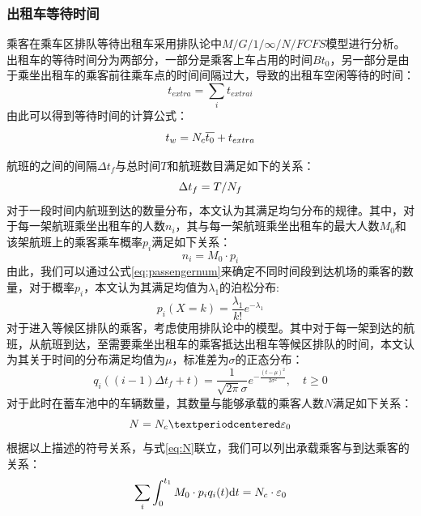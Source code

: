 \documentclass{cumcm}
\begin{document}
\subsubsection{出租车等待时间}
乘客在乘车区排队等待出租车采用排队论中$M/G/1/\infty/N/FCFS$模型进行分析。出租车的等待时间分为两部分，一部分是乘客上车占用的时间$Bt_0$，另一部分是由于乘坐出租车的乘客前往乘车点的时间间隔过大，导致的出租车空闲等待的时间：
\begin{equation}
	t_{extra}=\sum_it_{extrai}
	\label{eq:textrafunc}
\end{equation}
由此可以得到等待时间\waittime 的计算公式：
\begin{equation}
	\mbox{$t_w$}=\mbox{$N_c$}\overline{t_0}+t_{extra}
	\label{eq:tfunc}
\end{equation}
\par
航班的之间的间隔$\Delta t_f$与总时间$T$和航班数目\flightnum 满足如下的关系：
\begin{equation}
	\Delta t_f=T/\mbox{$N_f$}
	\label{eq:deltatf}
\end{equation}
对于一段时间内航班到达的数量分布，本文认为其满足均匀分布的规律。其中，对于每一架航班乘坐出租车的人数$n_i$，其与每一架航班乘坐出租车的最大人数$M_0$和该架航班上的乘客乘车概率$p_i$满足如下关系：
\begin{equation}
	n_i=M_0·p_i
	\label{eq:passengernum}
\end{equation}
由此，我们可以通过公式\ref{eq:passengernum}来确定不同时间段到达机场的乘客的数量，对于概率$p_i$，本文认为其满足均值为$\lambda_1$的泊松分布:
\begin{equation}
	p_i(X=k)=\frac{\lambda_1}{k!}e^{-\lambda_1}
	\label{eq:pi}
\end{equation}
对于进入等候区排队的乘客，考虑使用排队论中的模型。其中对于每一架到达的航班，从航班到达，至需要乘坐出租车的乘客抵达出租车等候区排队的时间，本文认为其关于时间的分布满足均值为$\mu$，标准差为$\sigma$的正态分布：
\begin{equation}
	q_i((i-1)\Delta t_f+t)=\frac{1}{\sqrt{2\pi}\sigma}e^{-\frac{(t-\mu)^2}{2\sigma^2}},\quad t\ge0
	\label{eq:qi}
\end{equation}
对于此时在蓄车池中的车辆数量，其数量\taxinum 与能够承载的乘客人数$N$满足如下关系：
\begin{equation}
	N=\mbox{\taxinum}·\varepsilon_0
	\label{eq:N}
\end{equation}
根据以上描述的符号关系，与式\ref{eq:N}联立，我们可以列出承载乘客与到达乘客的关系：
\begin{equation}
	\sum_i\int_0^{t_1}M_0\cdot p_iq_i(t)\mathrm{d}t=\mbox{$N_c$}\cdot\varepsilon_0
\end{equation}
\end{document}
